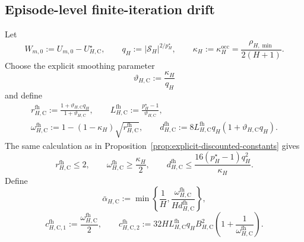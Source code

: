\documentclass{article}
\begin{document}
\subsection{Episode-level finite-iteration drift}
\label{sec:fh-ctd-drift-app}


Let
\begin{equation}
W_{m,0}:=U_{m,0}-U_{H,\mathrm C}^\star,\qquad q_H:=\lvert\mathcal S_H\rvert^{2/p_H^\star},\qquad \kappa_H:=\kappa_H^{\mathrm{occ}}=\frac{\rho_{H,\min}}{2(H+1)}.
\end{equation}
Choose the explicit smoothing parameter
\begin{equation}
\vartheta_{H,\mathrm C}:=\frac{\kappa_H}{q_H}
\end{equation}
and define
\begin{equation}
\begin{gathered}
r_{H,\mathrm C}^{\mathrm{fh}}:=\frac{1+\vartheta_{H,\mathrm C}q_H}{1+\vartheta_{H,\mathrm C}},\qquad L_{H,\mathrm C}^{\mathrm{fh}}:=\frac{p_H^\star-1}{\vartheta_{H,\mathrm C}},\\
\omega_{H,\mathrm C}^{\mathrm{fh}}:=1-(1-\kappa_H)\sqrt{r_{H,\mathrm C}^{\mathrm{fh}}},\qquad d_{H,\mathrm C}^{\mathrm{fh}}:=8L_{H,\mathrm C}^{\mathrm{fh}}q_H(1+\vartheta_{H,\mathrm C}q_H).
\end{gathered}
\end{equation}
The same calculation as in Proposition~\ref{prop:explicit-discounted-constants} gives
\begin{equation}
r_{H,\mathrm C}^{\mathrm{fh}}\le2,\qquad \omega_{H,\mathrm C}^{\mathrm{fh}}\ge\frac{\kappa_H}{2},\qquad d_{H,\mathrm C}^{\mathrm{fh}}\le\frac{16(p_H^\star-1)q_H^2}{\kappa_H}.
\end{equation}
Define
\begin{equation}
\bar\alpha_{H,\mathrm C}:=\min\left\{\frac{1}{H},\frac{\omega_{H,\mathrm C}^{\mathrm{fh}}}{Hd_{H,\mathrm C}^{\mathrm{fh}}}\right\},
\end{equation}
\begin{equation}
c_{H,\mathrm C,1}^{\mathrm{fh}}:=\frac{\omega_{H,\mathrm C}^{\mathrm{fh}}}{2},\qquad c_{H,\mathrm C,2}^{\mathrm{fh}}:=32HL_{H,\mathrm C}^{\mathrm{fh}}q_HB_{H,\mathrm C}^2\left(1+\frac{1}{\omega_{H,\mathrm C}^{\mathrm{fh}}}\right).
\end{equation}
\end{document}
